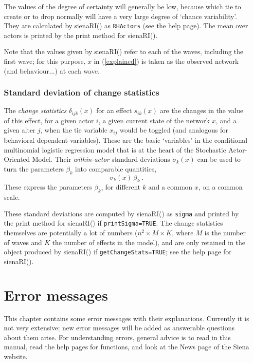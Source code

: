 \documentclass[a4paper,fleqn,11pt]{article}
\newcommand{\+}{\, + \,}
\newcommand{\sfn}[1]{\textsf{#1}}
\newcommand{\saom}{{Stochastic Actor-Oriented Model}}
\begin{document}
The values of the degree of certainty will generally be low, because
which tie to create or to drop normally will have a very large
degree of `chance variability'.
They are calculated by  \sfn{sienaRI()} as \texttt{RHActors}
(see the help page). The mean over actors is printed by the print method
for \sfn{sienaRI()}.

Note that the values given by \sfn{sienaRI()} refer to each of the waves,
including the first wave; for this purpose, $x$ in (\ref{explained})
is taken as the observed network (and behaviour...) at each wave.


\subsubsection{Standard deviation of change statistics}

The  \emph{change statistics} $\delta_{ijk}(x)$
for an effect $s_{ik}(x)$ are the changes in the
value of this effect, for a given actor $i$, a given current state
of the network $x$, and a given alter $j$, when the
tie variable $x_{ij}$ would be toggled
(and analogous for behavioral dependent variables).
These are the basic `variables' in the conditional multinomial
logistic regression model that is at the heart of the \saom.
Their \emph{within-actor} standard deviations $\sigma_k(x)$
can be used to turn the parameters $\beta_k$ into
comparable quantities,
\begin{equation}
    \sigma_k(x) \, \beta_k  \ .   \label{standardized.beta}
\end{equation}
These express the parameters $\beta_k$, for different $k$ and a common $x$,
on a common scale.

These standard deviations are computed by \sfn{sienaRI()} as \texttt{sigma}
and  printed by the print method for \sfn{sienaRI()} if \texttt{printSigma=TRUE}.
The change statistics themselves are potentially a lot of numbers
($n^2 \times M \times K$, where $M$ is the number of waves and $K$
the number of effects in the model), and are only retained in the object
produced by \sfn{sienaRI()} if \texttt{getChangeStats=TRUE};
see the help page for \sfn{sienaRI()}.

\newpage
\section{Error messages}


This chapter contains some error messages with their explanations.
Currently it is not very  extensive; new error messages will be added
as answerable questions about them arise.
For understanding errors, general advice is to read in this manual,
read the help pages for functions, and look at the News page of the
Siena website.
\medskip
\end{document}
